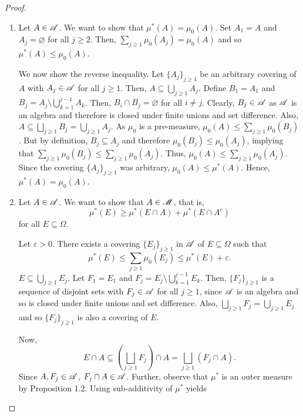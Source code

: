     \begin{proof}
        \begin{enumerate}
            \item Let $A \in \mathscr{A}$. We want to show that $\mu^*(A) = \mu_0(A)$. Set $A_1 = A$ and $A_j = \varnothing$ for all $j \geq 2$. Then, $\sum_{j \geq 1} \mu_0(A_j) = \mu_0(A)$ and so $\mu^*(A) \leq \mu_0(A)$.

            We now show the reverse inequality. Let $\{A_j\}_{j \geq 1}$ be an arbitrary covering of $A$ with $A_j \in \mathscr{A}$ for all $j \geq 1$. Then, $A \subseteq \bigcup_{j \geq 1} A_j$. Define $B_1 = A_1$ and $B_j = A_j \setminus \bigcup_{k=1}^{j-1}A_k$. Then, $B_i \cap B_j = \varnothing$ for all $i \neq j$. Clearly, $B_j \in \mathscr{A}$ as $\mathscr{A}$ is an algebra and therefore is closed under finite unions and set difference. Also, $A \subseteq \bigsqcup_{j \geq 1} B_j = \bigcup_{j \geq 1} A_j$. As $\mu_0$ is a pre-measure, $\mu_0(A) \leq \sum_{j \geq 1} \mu_0(B_j)$. But by definition, $B_j \subseteq A_j$ and therefore $\mu_0(B_j) \leq \mu_0(A_j)$, implying that $\sum_{j \geq 1} \mu_0(B_j) \leq \sum_{j \geq 1} \mu_0(A_j)$. Thus, $\mu_0(A) \leq \sum_{j \geq 1} \mu_0(A_j)$. Since the covering $\{A_j\}_{j \geq 1}$ was arbitrary, $\mu_0(A) \leq \mu^*(A)$. Hence, $\mu^*(A) = \mu_0(A)$.

            \item Let $A \in \mathscr{A}$. We want to show that $A \in \mathscr{M}$, that is, 
            \begin{equation*}
                \mu^*(E) \geq \mu^*(E \cap A) + \mu^*(E \cap A^c)
            \end{equation*}
            for all $E \subseteq \Omega$. 

            Let $\varepsilon > 0$. There exists a covering $\{E_j\}_{j \geq 1}$ in $\mathscr{A}$ of $E \subseteq \Omega$ such that
            \begin{equation}
                \mu^*(E) \leq \sum_{j \geq 1} \mu_0(E_j) \leq \mu^*(E) + \varepsilon.
            \end{equation}
            $E \subseteq \bigcup_{j \geq 1} E_j$. Let $F_1 = E_1$ and $F_j = E_j \setminus \bigcup_{k=1}^{j-1}E_k$. Then, $\{F_j\}_{j\geq1}$ is a sequence of disjoint sets with $F_j \in \mathscr{A}$ for all $j \geq 1$, since $\mathscr{A}$ is an algebra and so is closed under finite unions and set difference. Also, $\bigsqcup_{j \geq 1} F_j = \bigcup_{j \geq 1} E_j$ and so $\{F_j\}_{j \geq 1}$ is also a covering of $E$.

            Now, 
            \begin{equation*}
                E \cap A \subseteq \left( \bigsqcup_{j \geq 1} F_j \right) \cap A = \bigsqcup_{j \geq 1} (F_j \cap A).
            \end{equation*}
            Since $A, F_j \in \mathscr{A}$, $F_j \cap A \in \mathscr{A}$. Further, observe that $\mu^*$ is an outer measure by Proposition 1.2. Using sub-additivity of $\mu^*$ yields


\end{enumerate}
\end{proof}
